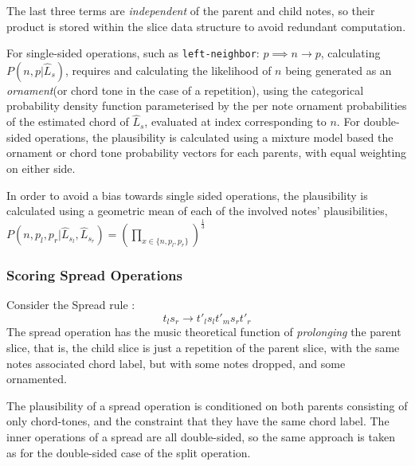 \documentclass[12pt,a4paper,twoside,openany]{report} \usepackage[pdfborder={0 0 0}]{hyperref}    %
\theoremstyle{definition} \newtheorem{definition}{Definition}[section]
\begin{document}
    The last three terms are \textit{independent} of the parent and child notes, so their product is stored within the slice data structure to
    avoid redundant computation.

    For single-sided operations, such as \texttt{left-neighbor}: $p \implies n \to p$, calculating $P(n, p|\hat{L}_s)$, requires
    and calculating the likelihood of $n$ being generated as an \textit{ornament}(or chord tone in the case of
    a repetition), using the categorical probability density function parameterised by the per note ornament
    probabilities of the estimated chord of $\hat{L}_s$, evaluated at index corresponding to $n$. For double-sided
    operations, the plausibility is calculated using a mixture model based the ornament or chord tone probability
    vectors for each parents, with equal weighting on either side. 

    In order to avoid a bias towards single sided operations, the plausibility is calculated using a geometric mean of
    each of the involved notes' plausibilities, $P(n,p_l,p_r|\hat{L}_{s_l}, \hat{L}_{s_r}) = (\prod\limits_{x\in \{n,
    p_l, p_r\}})^{\frac{1}{3}}$

    \FloatBarrier \subsubsection{Scoring Spread Operations}

    Consider the Spread rule : \[t_l s_r \to t'_l s_l t'_m s_r t'_r\] 
    The spread operation has the music theoretical function of \textit{prolonging} the parent slice, that is, the child
    slice is just a repetition of the parent slice, with the same notes associated chord label, but with some notes
    dropped, and some ornamented. 

    The plausibility of a spread operation is conditioned on both parents consisting of only chord-tones, and the
    constraint that they have the same chord label. The inner operations of a spread are all double-sided, so the same
    approach is taken as for the double-sided case of the split operation.

\end{document}
